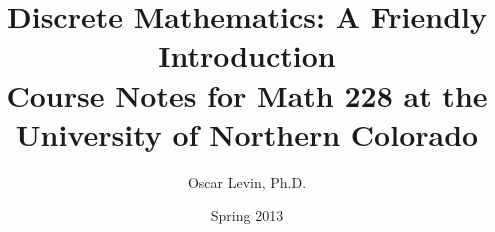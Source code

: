 \def\course{Math 228}

\title{Discrete Mathematics: A Friendly Introduction\\
{\large Course Notes for Math 228 at the University of Northern Colorado}}




\author{Oscar Levin, Ph.D.}

\date{Spring 2013} %

\maketitle

  

\tableofcontents


